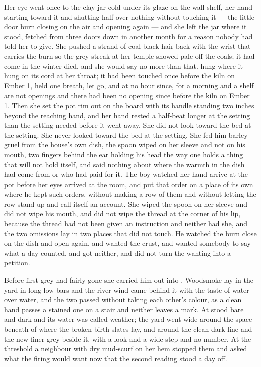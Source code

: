 Her eye went once to the clay jar cold under its glaze on the wall shelf, her hand starting toward it and shutting half over nothing without touching it --- the little-door burn closing on the air and opening again --- and she left the jar where it stood, fetched from three doors down in another month for a reason nobody had told her to give. She pushed a strand of coal-black hair back with the wrist that carries the burn so the grey streak at her temple showed pale off the coals; it had come in the winter  died, and she would say no more than that.  hung where it hung on its cord at her throat; it had been touched once before the kiln on Ember 1, held one breath, let go, and at no hour since, for a morning and a shelf are not openings and there had been no opening since before the kiln on Ember 1. Then she set the pot rim out on the board with its handle standing two inches beyond the reaching hand, and her hand rested a half-beat longer at the setting than the setting needed before it went away. She did not look toward the bed at the setting. She never looked toward the bed at the setting. She fed him barley gruel from the house's own dish, the spoon wiped on her sleeve and not on his mouth, two fingers behind the ear holding his head the way one holds a thing that will not hold itself, and said nothing about where the warmth in the dish had come from or who had paid for it. The boy watched her hand arrive at the pot before her eyes arrived at the room, and put that order on a place of its own where he kept such orders, without making a row of them and without letting the row stand up and call itself an account. She wiped the spoon on her sleeve and did not wipe his mouth, and did not wipe the thread at the corner of his lip, because the thread had not been given an instruction and neither had she, and the two omissions lay in two places that did not touch. He watched the burn close on the dish and open again, and wanted the crust, and wanted somebody to say what a day counted, and got neither, and did not turn the wanting into a petition.

\scenebreak

Before first grey had fairly gone she carried him out into . Woodsmoke lay in the yard in long low bars and the river wind came behind it with the taste of water over water, and the two passed without taking each other's colour, as a clean hand passes a stained one on a stair and neither leaves a mark. At   stood bare and dark and its water was called weather; the yard went wide around the space beneath  of  where the broken birth-slates lay, and around the clean dark line and the new finer grey beside it, with a look and a wide step and no number. At the threshold a neighbour with dry mud-scurf on her hem stopped them and asked what the firing would want now that the second reading stood a day off.

